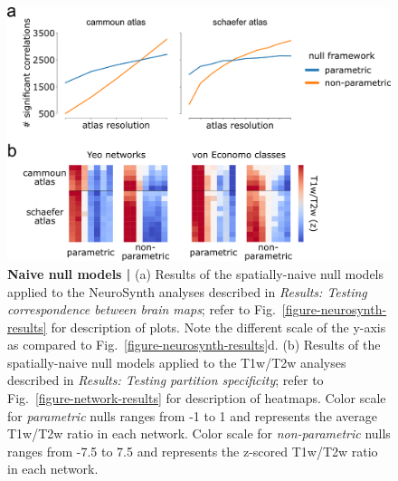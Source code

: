 \documentclass[12pt,aps,pra,reprint,showkeys]{revtex4-1}
\begin{document}
\begin{figure}[htp]
  \begin{center}
    \centerline{\includegraphics[width=\textwidth]{naive-nulls.png}}
    \caption{
      \textbf{Naive null models |}
      (a) Results of the spatially-naive null models applied to the NeuroSynth analyses described in \textit{Results: Testing correspondence between brain maps}; refer to Fig.~\ref{figure-neurosynth-results} for description of plots.
      Note the different scale of the y-axis as compared to Fig.~\ref{figure-neurosynth-results}d.
      (b) Results of the spatially-naive null models applied to the T1w/T2w analyses described in \textit{Results: Testing partition specificity}; refer to Fig.~\ref{figure-network-results} for description of heatmaps.
      Color scale for \textit{parametric} nulls ranges from -1 to 1 and represents the average T1w/T2w ratio in each network.
      Color scale for \textit{non-parametric} nulls ranges from -7.5 to 7.5 and represents the z-scored T1w/T2w ratio in each network.
    }
    \label{supp-figure-naive-nulls}
  \end{center}
\end{figure}
\end{document}

